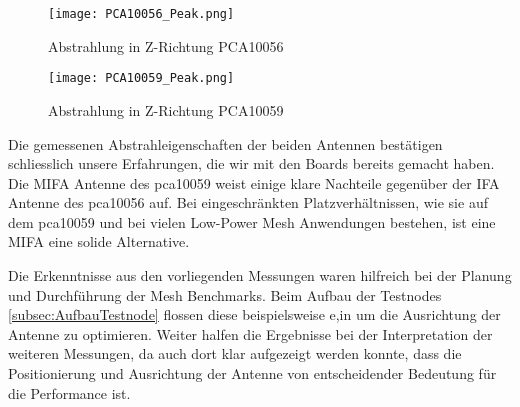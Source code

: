 \begin{figure}[!htbp]
\centering
\begin{minipage}[b]{0.49\linewidth}
	\centering
	\texttt{[image: PCA10056\_Peak.png]}
	\caption{Abstrahlung in Z-Richtung PCA10056}
	\label{fig:PCA10056Peak}
\end{minipage}
\begin{minipage}[b]{0.49\linewidth}
	\centering
	\texttt{[image: PCA10059\_Peak.png]}
	\caption{Abstrahlung in Z-Richtung PCA10059}
	\label{fig:PCA10059Peak}
\end{minipage}
\end{figure}

Die gemessenen Abstrahleigenschaften der beiden Antennen bestätigen schliesslich unsere Erfahrungen, die wir mit den Boards bereits gemacht haben. Die MIFA Antenne des pca10059 weist einige klare Nachteile gegenüber der IFA Antenne des pca10056 auf. Bei eingeschränkten Platzverhältnissen, wie sie auf dem pca10059 und bei vielen Low-Power Mesh Anwendungen bestehen, ist eine MIFA eine solide Alternative.

Die Erkenntnisse aus den vorliegenden Messungen waren hilfreich bei der Planung und Durchführung der Mesh Benchmarks. Beim Aufbau der Testnodes \ref{subsec:AufbauTestnode} flossen diese beispielsweise e,in um die Ausrichtung der Antenne zu optimieren. Weiter halfen die Ergebnisse bei der Interpretation der weiteren Messungen, da auch dort klar aufgezeigt werden konnte, dass die Positionierung und Ausrichtung der Antenne von entscheidender Bedeutung für die Performance ist.

